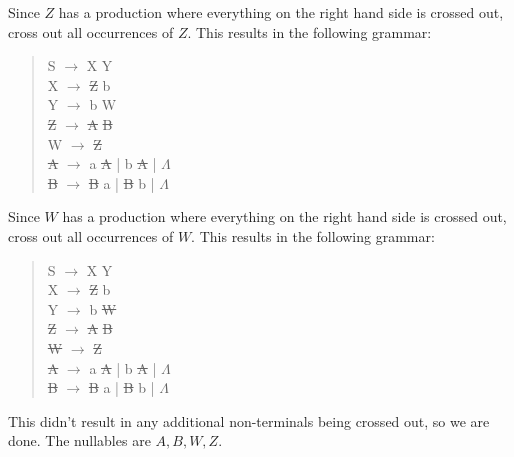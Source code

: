 \documentclass[letterpaper,12pt,openany,reqno]{book}%
\begin{document}
Since $Z$ has a production where everything on the right hand side is crossed out, cross out all occurrences of $Z$. This results in the following grammar:
\begin{quote}
{\ttfamily S} $\rightarrow$ {\ttfamily X Y}\\
{\ttfamily X} $\rightarrow$ {\ttfamily \sout{Z} b}\\
{\ttfamily Y} $\rightarrow$ {\ttfamily b W}\\
{\ttfamily \sout{Z}} $\rightarrow$ {\ttfamily \sout{A} \sout{B}}\\
{\ttfamily W} $\rightarrow$ {\ttfamily \sout{Z}}\\
{\ttfamily \sout{A}} $\rightarrow$ {\ttfamily a \sout{A} | b \sout{A} | $\Lambda$}\\
{\ttfamily \sout{B}} $\rightarrow$ {\ttfamily \sout{B} a | \sout{B} b | $\Lambda$}\\
\end{quote}
Since $W$ has a production where everything on the right hand side is crossed out, cross out all occurrences of $W$. This results in the following grammar:
\begin{quote}
{\ttfamily S} $\rightarrow$ {\ttfamily X Y}\\
{\ttfamily X} $\rightarrow$ {\ttfamily \sout{Z} b}\\
{\ttfamily Y} $\rightarrow$ {\ttfamily b \sout{W}}\\
{\ttfamily \sout{Z}} $\rightarrow$ {\ttfamily \sout{A} \sout{B}}\\
{\ttfamily \sout{W}} $\rightarrow$ {\ttfamily \sout{Z}}\\
{\ttfamily \sout{A}} $\rightarrow$ {\ttfamily a \sout{A} | b \sout{A} | $\Lambda$}\\
{\ttfamily \sout{B}} $\rightarrow$ {\ttfamily \sout{B} a | \sout{B} b | $\Lambda$}\\
\end{quote}
This didn't result in any additional non-terminals being crossed out, so we are done. The nullables are $A, B, W, Z$.
\end{document}
